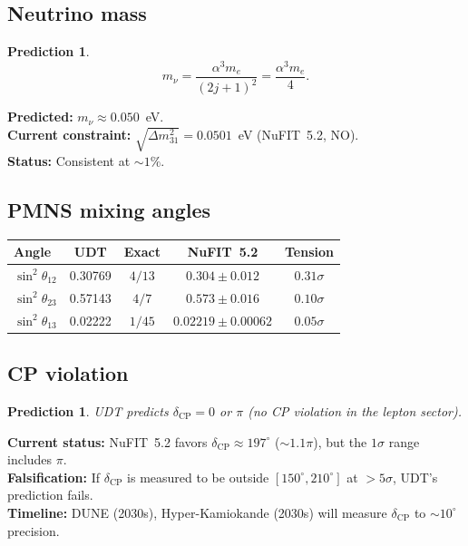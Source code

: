 \documentclass[11pt,letterpaper]{article}
\newtheorem{prediction}[theorem]{Prediction}
\numberwithin{equation}{section}
\begin{document}
\subsection{Neutrino mass}

\begin{prediction}
\begin{equation}
  m_\nu = \frac{\alpha^3 m_e}{(2j+1)^2} = \frac{\alpha^3 m_e}{4}.
\end{equation}
\end{prediction}

\noindent\textbf{Predicted:} $m_\nu \approx 0.050$~eV.\\
\textbf{Current constraint:} $\sqrt{\Delta m^2_{31}} = 0.0501$~eV (NuFIT~5.2, NO).\\
\textbf{Status:} Consistent at $\sim 1\%$.

\subsection{PMNS mixing angles}

\begin{longtable}{lcccc}
\toprule
Angle & UDT & Exact & NuFIT~5.2 & Tension \\
\midrule
\endfirsthead
$\sin^2\theta_{12}$ & 0.30769 & $4/13$ & $0.304 \pm 0.012$ & $0.31\sigma$ \\
$\sin^2\theta_{23}$ & 0.57143 & $4/7$  & $0.573 \pm 0.016$ & $0.10\sigma$ \\
$\sin^2\theta_{13}$ & 0.02222 & $1/45$ & $0.02219 \pm 0.00062$ & $0.05\sigma$ \\
\bottomrule
\end{longtable}

\subsection{CP violation}

\begin{prediction}
UDT predicts $\delta_\mathrm{CP} = 0$ or $\pi$ (no CP violation in the lepton sector).
\end{prediction}

\noindent\textbf{Current status:} NuFIT~5.2 favors $\delta_\mathrm{CP} \approx 197^\circ$
($\sim 1.1\pi$), but the $1\sigma$ range includes $\pi$.\\
\textbf{Falsification:} If $\delta_\mathrm{CP}$ is measured to be outside
$[150^\circ, 210^\circ]$ at $> 5\sigma$, UDT's prediction fails.\\
\textbf{Timeline:} DUNE (2030s), Hyper-Kamiokande (2030s) will measure
$\delta_\mathrm{CP}$ to $\sim 10^\circ$ precision.
\end{document}
